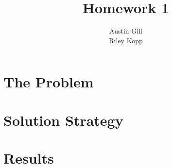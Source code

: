 \documentclass{article}
\title{Homework 1}
\author{Austin Gill \\ Riley Kopp}
\begin{document}
\maketitle
\begingroup
\hypersetup{linkcolor=black}
\tableofcontents
\endgroup
\newpage

\section{The Problem}\label{sec:problem}

\section{Solution Strategy}\label{sec:strategy}

\section{Results}\label{sec:results}
\end{document}
